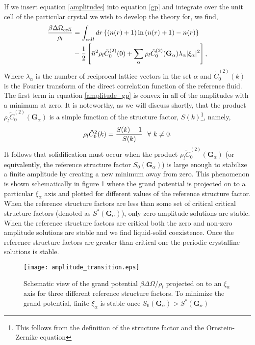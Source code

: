 If we insert equation \ref{amplitudes} into equation \ref{gp} and integrate
over the unit cell of the particular crystal we wish to develop the theory for,
we find,
%
\begin{align}
    \label{amplitude_gp} 
    \frac{\beta \Delta\Omega_{cell}}{\rho_l} &=  \int_{cell} 
        dr \left\lbrace (n(r) + 1)\ln\left(n(r) + 1\right) - n(r) \right\rbrace \nonumber \\
    &- \frac{1}{2} \left[\bar{n} ^ 2 \rho_l\tilde{C}^{(2)}_0(0) + \sum_\alpha\rho_l\tilde{C}^{(2)}_0
            (\mathbf{G}_\alpha) \lambda_\alpha\vert\xi_\alpha\vert^2\right],
\end{align}
%
Where $\lambda_\alpha$ is the number of reciprocal lattice vectors in the set
$\alpha$ and $\tilde{C}^{(2)}_0(k)$ is the Fourier transform of the direct
correlation function of the reference fluid. The first term in equation
\ref{amplitude_gp} is convex in all of the amplitudes with a minimum at zero.
It is noteworthy, as we will discuss shortly, that the product $\rho_l
\tilde{C}^{(2)}_0(\mathbf{G}_\alpha)$ is a simple function of the structure
factor, $S(k)$\footnote{This follows from the definition of the structure
factor and the Ornstein-Zernike equation}, namely,
%
\begin{equation}
    \rho_l \tilde{C}_0^2(k) = \frac{S(k) - 1}{S(k)}\,\,\,\,\forall \,\,k \ne 0.
\end{equation}
%
It follows that solidification must occur when the product $\rho_l
\tilde{C}^{(2)}_0(\mathbf{G}_\alpha)$ (or equivalently, the reference structure
factor $S_0(\mathbf{G}_\alpha)$) is large enough to stabilize a finite
amplitude by creating a new minimum away from zero.  This phenomenon is shown
schematically in figure \ref{fig:amplitude_transition} where the grand
potential is projected on to a particular $\xi_\alpha$ axis and plotted for
different values of the reference structure factor. When the reference
structure factors are less than some set of critical critical structure factors 
(denoted as $S^*(\mathbf{G}_\alpha)$), only zero amplitude solutions are
stable.  When the reference structure factors are critical both the zero and
non-zero amplitude solutions are stable and we find liquid-solid coexistence.
Once the reference structure factors are greater than critical one the periodic
crystalline solutions is stable.
%
\begin{figure}
    \centering
    \texttt{[image: amplitude\_transition.eps]}
    \caption[Grand Potential through the Solidification transition]{ 
        Schematic view of the grand potential $\beta\Delta\Omega / \rho_l$
        projected on to an $\xi_\alpha$ axis for three different reference
        structure factors. To minimize the grand potential, finite $\xi_\alpha$
        is stable once $S_0(\mathbf{G}_\alpha) > S^*(\mathbf{G}_\alpha)$
    }\label{fig:amplitude_transition}
\end{figure}
